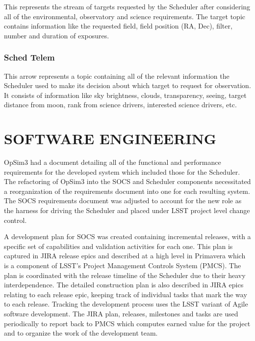 \documentclass[]{spie}  %
\begin{document}
This represents the stream of targets requested by the Scheduler after considering all of the environmental, observatory and science requirements. The target topic contains information like the requested field, field position (RA, Dec), filter, number and duration of exposures. 

\subsubsection{Sched Telem}

This arrow represents a topic containing all of the relevant information the Scheduler used to make its decision about which target to request for observation. It consists of information like sky brightness, clouds, transparency, seeing, target distance from moon, rank from science drivers, interested science drivers, etc. 

\section{SOFTWARE ENGINEERING}

OpSim3 had a document detailing all of the functional and performance requirements for the developed system which included those for the Scheduler. The refactoring of OpSim3 into the SOCS and Scheduler components necessitated a reorganization of the requirements document into one for each resulting system. The SOCS requirements document was adjusted to account for the new role as the harness for driving the Scheduler and placed under LSST project level change control.

A development plan for SOCS was created containing incremental releases, with a specific set of capabilities and validation activities for each one. This plan is captured in JIRA\cite{JIRA} release epics and described at a high level in Primavera\cite{Primavera} which is a component of LSST's Project Management Controls System (PMCS)\cite{Kantor_SPIE2016}. The plan is coordinated with the release timeline of the Scheduler due to their heavy interdependence. The detailed construction plan is also described in JIRA epics relating to each release epic, keeping track of individual tasks that mark the way to each release. Tracking the development process uses the LSST variant of Agile software development\cite{Kantor_SPIE2016}. The JIRA plan, releases, milestones and tasks are used periodically to report back to PMCS which computes earned value\cite{Kantor_SPIE2016} for the project and to organize the work of the development team.
\end{document}
